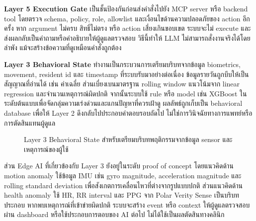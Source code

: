 \textbf{Layer 5 Execution Gate} เป็นชั้นป้องกันก่อนส่งคำสั่งไปยัง MCP server หรือ backend tool โดยตรวจ schema, policy, role, allowlist และเงื่อนไขด้านความปลอดภัยของ action อีกครั้ง หาก argument ไม่ครบ สิทธิ์ไม่ตรง หรือ action เสี่ยงเกินขอบเขต ระบบจะไม่ execute และส่งผลกลับเป็นคำถามหรือคำอธิบายให้ผู้ดูแลตรวจสอบ วิธีนี้ทำให้ LLM ไม่สามารถสั่งงานจริงได้โดยลำพัง แม้จะสร้างข้อความที่ดูเหมือนคำสั่งถูกต้อง

\textbf{Layer 3 Behavioral State} ทำงานเป็นกระบวนการเตรียมบริบทจากข้อมูล biometrics, movement, resident id และ timestamp ที่ระบบรับมาอย่างต่อเนื่อง ข้อมูลรายวันถูกบีบให้เป็นสัญญาณที่อ่านได้ เช่น ค่าเฉลี่ย ส่วนเบี่ยงเบนมาตรฐาน rolling window แนวโน้มจาก linear regression และจำนวนเหตุการณ์ผิดปกติ จากนั้นระบบใช้ rule หรือ model เช่น XGBoost ในระดับต้นแบบเพื่อจัดกลุ่มความเร่งด่วนและแกนปัญหาที่ควรเฝ้าดู ผลลัพธ์ถูกเก็บเป็น behavioral database เพื่อให้ Layer 2 ดึงกลับไปประกอบคำตอบรอบถัดไป ไม่ใช่การวินิจฉัยทางการแพทย์หรือการตัดสินแทนผู้ดูแล

\begin{figure}[!htbp]
    \centering
    \caption{Layer 3 Behavioral State สำหรับเตรียมบริบทพฤติกรรมจากข้อมูล sensor และเหตุการณ์ของผู้ใช้}
    \label{fig:ch3_ai_behavioral_state}
\end{figure}
\FloatBarrier

ส่วน Edge AI ที่เกี่ยวข้องกับ Layer 3 ยังอยู่ในระดับ proof of concept โดยแนวคิดด้าน motion anomaly ใช้ข้อมูล IMU เช่น gyro magnitude, acceleration magnitude และ rolling standard deviation เพื่อสังเกตการเคลื่อนไหวที่ต่างจากรูปแบบปกติ ส่วนแนวคิดด้าน health anomaly ใช้ HR, RR interval และ PPG จาก Polar Verity Sense เป็นบริบทประกอบ หากพบเหตุการณ์ที่เข้าข่ายผิดปกติ ระบบจะสร้าง event หรือ context ให้ผู้ดูแลตรวจสอบผ่าน dashboard หรือใช้ประกอบการตอบของ AI ต่อไป ไม่ได้ใช้เป็นผลตัดสินทางคลินิก

